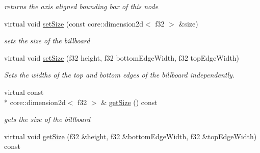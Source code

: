 \begin{DoxyCompactItemize}
\begin{DoxyCompactList}\small\item\em returns the axis aligned bounding box of this node \end{DoxyCompactList}\item 
\hypertarget{classirr_1_1scene_1_1_c_billboard_scene_node_a713a637759371a43ec44c784edab1247}{virtual void \hyperlink{classirr_1_1scene_1_1_c_billboard_scene_node_a713a637759371a43ec44c784edab1247}{set\-Size} (const core\-::dimension2d$<$ f32 $>$ \&size)}\label{classirr_1_1scene_1_1_c_billboard_scene_node_a713a637759371a43ec44c784edab1247}

\begin{DoxyCompactList}\small\item\em sets the size of the billboard \end{DoxyCompactList}\item 
\hypertarget{classirr_1_1scene_1_1_c_billboard_scene_node_aeb3cb4624a76625b71b324ed17b79944}{virtual void \hyperlink{classirr_1_1scene_1_1_c_billboard_scene_node_aeb3cb4624a76625b71b324ed17b79944}{set\-Size} (f32 height, f32 bottom\-Edge\-Width, f32 top\-Edge\-Width)}\label{classirr_1_1scene_1_1_c_billboard_scene_node_aeb3cb4624a76625b71b324ed17b79944}

\begin{DoxyCompactList}\small\item\em Sets the widths of the top and bottom edges of the billboard independently. \end{DoxyCompactList}\item 
\hypertarget{classirr_1_1scene_1_1_c_billboard_scene_node_a350ef35703268102aa324aa161f5ff1d}{virtual const \\*
core\-::dimension2d$<$ f32 $>$ \& \hyperlink{classirr_1_1scene_1_1_c_billboard_scene_node_a350ef35703268102aa324aa161f5ff1d}{get\-Size} () const }\label{classirr_1_1scene_1_1_c_billboard_scene_node_a350ef35703268102aa324aa161f5ff1d}

\begin{DoxyCompactList}\small\item\em gets the size of the billboard \end{DoxyCompactList}\item 
\hypertarget{classirr_1_1scene_1_1_c_billboard_scene_node_a98c7fde0dfe498fbf983152b9c22ec81}{virtual void \hyperlink{classirr_1_1scene_1_1_c_billboard_scene_node_a98c7fde0dfe498fbf983152b9c22ec81}{get\-Size} (f32 \&height, f32 \&bottom\-Edge\-Width, f32 \&top\-Edge\-Width) const }\label{classirr_1_1scene_1_1_c_billboard_scene_node_a98c7fde0dfe498fbf983152b9c22ec81}


\end{DoxyCompactItemize}
